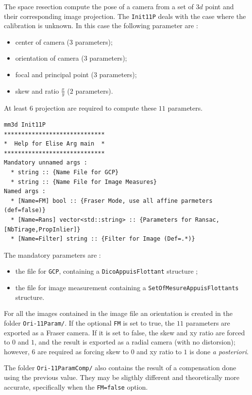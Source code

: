 The space resection compute the pose of a camera from a set of $3d$ point and their corresponding
image projection. The {\tt Init11P} deals with the case where the calibration is unknown. In this case the
following parameter are :


\begin {itemize}
    \item center of camera ($3$ parameters);
    \item orientation of camera ($3$ parameters);
    \item focal and principal point ($3$ parameters);
    \item skew and ratio $\frac xy$ ($2$ parameters).
\end {itemize}

At least $6$ projection are required to compute these $11$ parameters. 



\begin{verbatim}
mm3d Init11P
*****************************
*  Help for Elise Arg main  *
*****************************
Mandatory unnamed args : 
  * string :: {Name File for GCP}
  * string :: {Name File for Image Measures}
Named args : 
  * [Name=FM] bool :: {Fraser Mode, use all affine parmeters (def=false)}
  * [Name=Rans] vector<std::string> :: {Parameters for Ransac, [NbTirage,PropInlier]}
  * [Name=Filter] string :: {Filter for Image (Def=.*)}
\end{verbatim}

The mandatory parameters are :

\begin {itemize}
  \item the file for {\tt GCP}, containing a {\tt DicoAppuisFlottant} structure ;
  \item the file for image measurement containing a {\tt SetOfMesureAppuisFlottants} structure.
\end {itemize}

For all the images contained in the image file an orientation is created in the folder {\tt Ori-11Param/}.
If the optional {\tt FM} is set to true, the $11$ parameters are exported as a Fraser camera. If it is
set to false, the skew and xy ratio are forced to $0$ and $1$, and the result is exported as a radial camera (with
no distorsion); however, $6$ are required as forcing skew to $0$ and xy ratio to $1$ is done
\emph{a posteriori}. 

The folder {\tt Ori-11ParamComp/} also contains the result of a compensation done using the previous value.
They may be sligthly different and theoretically more accurate, specifically when the {\tt FM=false} option.


